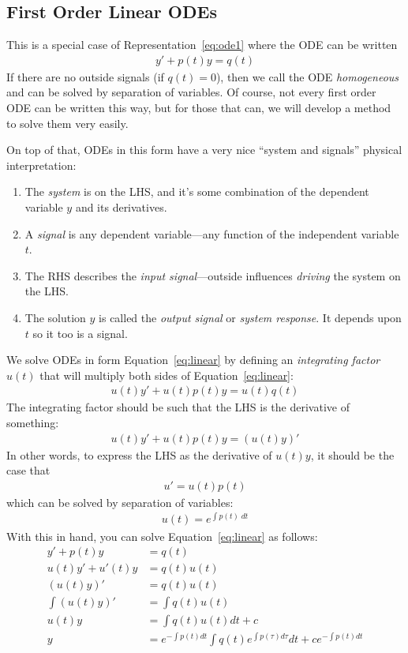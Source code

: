 \documentclass[12pt]{article}
\theoremstyle{plain}
\theoremstyle{definition}
\theoremstyle{remark}
\begin{document}
\clearpage
\subsection{First Order Linear ODEs}

This is a special case of Representation~\ref{eq:ode1} where the ODE can
be written
\begin{align}
  y' + p(t) y = q(t)
  \label{eq:linear}
\end{align}
If there are no outside signals (if $q(t)=0$), then we call the ODE
\emph{homogeneous} and can be solved by separation of variables.  Of
course, not every first order ODE can be written this way, but for those
that can, we will develop a method to solve them very easily.

On top of that, ODEs in this form have a very nice ``system and
signals'' physical interpretation:
\begin{enumerate}
  \item The \emph{system} is on the LHS, and it's some combination of
    the dependent variable $y$ and its derivatives.
  \item A \emph{signal} is any dependent variable---any function of the
    independent variable $t$.
  \item The RHS describes the \emph{input signal}---outside influences
    \emph{driving} the system on the LHS.
  \item The solution $y$ is called the \emph{output signal} or
    \emph{system response}. It depends upon $t$ so it too is a signal.
\end{enumerate}

We solve ODEs in form Equation~\ref{eq:linear} by defining an
\emph{integrating factor} $u(t)$ that will multiply both sides of
Equation~\ref{eq:linear}:
\begin{align*}
  u(t) y' + u(t)p(t) y = u(t) q(t)
\end{align*}
The integrating factor should be such that the LHS is the derivative of
something:
\begin{align*}
  u(t) y' + u(t) p(t) y = \left( u(t) y\right)'
\end{align*}
In other words, to express the LHS as the derivative of $u(t)y$, it
should be the case that
\begin{align*}
  u' = u(t) p(t)
\end{align*}
which can be solved by separation of variables:
\begin{align*}
  u(t) = e^{\int p(t) \; dt}
\end{align*}
With this in hand, you can solve Equation~\ref{eq:linear} as follows:
\begin{align*}
  y' + p(t) y &= q(t) \\
  u(t) y' + u'(t) y &= q(t)u(t)\\
  \left(u(t) y\right)' &= q(t)u(t) \\
  \int \left(u(t) y\right)' &= \int q(t)u(t) \\
  u(t) y &= \int q(t)u(t) dt + c\\
  y &= e^{-\int p(t) dt}\int q(t) e^{\int p(\tau) d\tau} dt+ ce^{-\int p(t) dt}\\
\end{align*}
\end{document}
